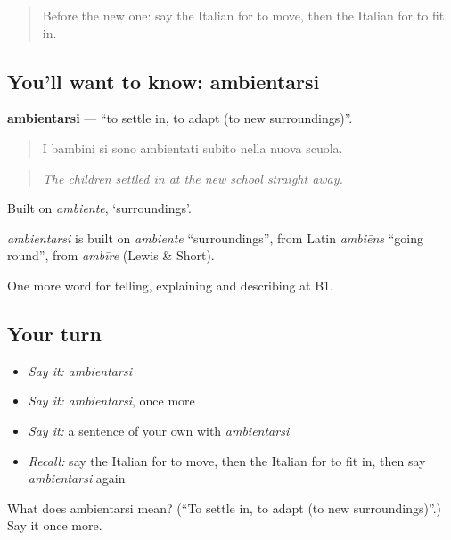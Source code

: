 \begin{quote}
Before the new one: say the Italian for to move, then the Italian for to fit in.
\end{quote}

\subsection*{You'll want to know: ambientarsi}
\textbf{ambientarsi} — \textquotedblleft{}to settle in, to adapt (to new surroundings)\textquotedblright{}.

\begin{quote}
I bambini si sono ambientati subito nella nuova scuola.
\end{quote}

\begin{quote}
\emph{The children settled in at the new school straight away.}
\end{quote}

Built on \emph{ambiente}, ‘surroundings’.

\begin{cousinweb}
\emph{ambientarsi} is built on \emph{ambiente} \textquotedblleft{}surroundings\textquotedblright{}, from Latin \emph{ambiēns} \textquotedblleft{}going round\textquotedblright{}, from \emph{ambīre} (Lewis \& Short).
\end{cousinweb}

\begin{grammarlens}[title={What you've built}]
One more word for telling, explaining and describing at B1.
\end{grammarlens}

\subsection*{Your turn}
\begin{itemize}
\raggedright
  \item \emph{Say it:} \emph{ambientarsi}
  \item \emph{Say it:} \emph{ambientarsi}, once more
  \item \emph{Say it:} a sentence of your own with \emph{ambientarsi}
  \item \emph{Recall:} say the Italian for to move, then the Italian for to fit in, then say \emph{ambientarsi} again
\end{itemize}

\begin{tcolorbox}[breakable,colback=teal!4,colframe=teal!35!black,title={Before you move on}]
What does ambientarsi mean? (\textquotedblleft{}To settle in, to adapt (to new surroundings)\textquotedblright{}.) Say it once more.
\end{tcolorbox}
